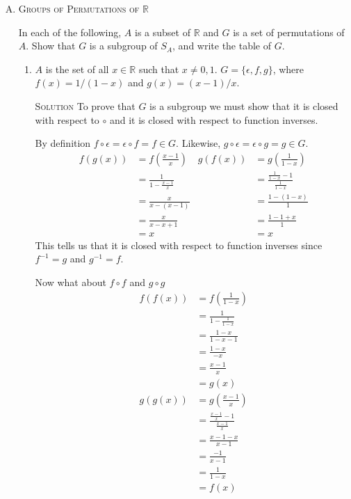 \documentclass[twoside]{amsart}
\newcommand{\Reals}{\ensuremath{\mathbb{R}}\xspace}
\newcommand{\solution}{\textsc{Solution}\xspace}
\begin{document}
\begin{enumerate}[A.]
\begin{enumerate}[1]
   \end{enumerate}

   \vspace{5pt}
   \item \textsc{Groups of Permutations of} \Reals

   In each of the following, $A$ is a subset of \Reals and $G$ is a set of 
   permutations of $A$. Show that $G$ is a subgroup of $S_A$, and write
   the table of $G$.

   \begin{enumerate}[1]
      \item $A$ is the set of all $x \in \Reals$ such that $x \ne 0,1$.
      $G = \{\epsilon, f, g\}$, where $f(x) = 1/(1-x)$ and 
      $g(x)=(x-1)/x$.

      \solution To prove that $G$ is a subgroup we must show that it
      is closed with respect to $\circ$ and it is closed with 
      respect to function inverses.

      By definition $f \circ \epsilon = \epsilon \circ f = f \in G$.
      Likewise, $g \circ \epsilon = \epsilon \circ g = g \in G$.
      \begin{align*}
         f(g(x)) & = f\left(\frac{x-1}{x}\right) & 
	 g(f(x)) & = g\left(\frac{1}{1-x}\right) \\
                 & = \frac{1}{1-\displaystyle \frac{x-1}{x}} &
		 & = \frac{\displaystyle\frac{1}{1-x}-1}
		          {\displaystyle\frac{1}{1-x}} \\
	         & = \frac{x}{x-(x-1)} &
		 & = \frac{1-(1-x)}{1} \\
		 & = \frac{x}{x-x+1} &
		 & = \frac{1-1+x}{1} \\
		 & = x &
		 & = x
      \end{align*}
      This tells us that
      it is closed with respect to function inverses since
      $f^{-1}=g$ and $g^{-1}=f$.
      
      Now what about $f \circ f$ and $g \circ g$
      \begin{align*}
         f(f(x)) & = f\left(\frac{1}{1-x}\right) \\
	         & = \frac{1}{1-\displaystyle\frac{1}{1-x}}\\
		 & = \frac{1-x}{1-x-1} \\
		 & = \frac{1-x}{-x} \\
		 & = \frac{x-1}{x} \\
		 & = g(x) \\
	 g(g(x)) & = g\left(\frac{x-1}{x}\right) \\
	         & = \frac{\displaystyle\frac{x-1}{x}-1}
		          {\displaystyle\frac{x-1}{x}} \\
	         & = \frac{x-1-x}{x-1} \\
		 & = \frac{-1}{x-1} \\
		 & = \frac{1}{1-x} \\
		 & = f(x)
      \end{align*}
      


\end{enumerate}
\end{enumerate}
\end{document}
